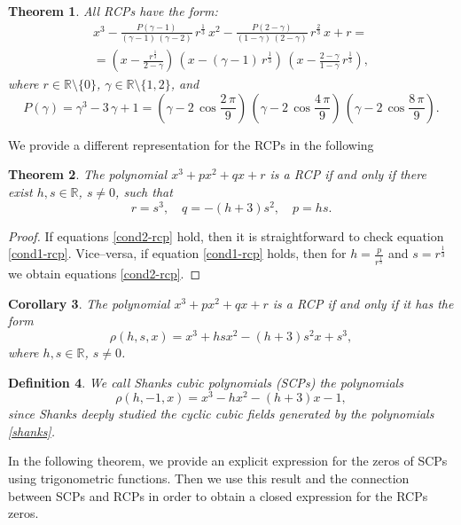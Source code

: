 \documentclass[12pt,reqno]{article}
\newtheorem{theorem}{Theorem}
\newtheorem{corollary}[theorem]{Corollary}
\newtheorem{defin}[theorem]{Definition}
\newenvironment{definition}{\begin{defin}\normalfont\quad}{\end{defin}}
\begin{document}
\begin{theorem}All RCPs have the form: 
\begin{multline*}
x^3 - \frac{P(\gamma-1)}{(\gamma-1)\, (\gamma-2)}\, r^{\frac{1}{3}}\, x^2 -
\frac{P(2-\gamma)}{(1-\gamma)\, (2-\gamma)}\, r^{\frac{2}{3}}\, x  + r = {}\\
{}=
\left( x - \frac{r^{\frac{1}{3}}}{2-\gamma} \right)\,
\left( x - (\gamma -1)\, r^{\frac{1}{3}}  \right)\,
\left( x - \frac{2-\gamma}{1-\gamma}\,r^{\frac{1}{3}} \right),
\end{multline*}
where $r\in \mathbb{R}\setminus \{0\}$,
$\gamma\in \mathbb{R}\setminus \{1,2\}$, and
$$
P(\gamma)=
\gamma^3 - 3\, \gamma + 1 =
\left( \gamma - 2\, \cos \frac{2\, \pi}{9} \right)\,
\left( \gamma - 2\, \cos \frac{4\, \pi}{9} \right)\,
\left( \gamma - 2\, \cos \frac{8\, \pi}{9} \right).
$$
\end{theorem}
 We provide a different representation for the RCPs in the following
\begin{theorem}
The polynomial $x^3+px^2+qx+r$ is a RCP if and only if there exist $h,s \in \mathbb R$, $s\not=0$, such that
\begin{equation} \label{cond2-rcp} r=s^3,\quad q=-(h+3)s^2,\quad p=hs.  \end{equation}
\end{theorem}
\begin{proof}
If equations \eqref{cond2-rcp} hold, then it is straightforward to check equation \eqref{cond1-rcp}. Vice--versa, if equation \eqref{cond1-rcp} holds, then for $h=\frac{p}{r^{\frac{1}{3}}}$ and $s=r^{\frac{1}{3}}$ we obtain equations \eqref{cond2-rcp}.
\end{proof}
\begin{corollary}
The polynomial $x^3+px^2+qx+r$ is a RCP if and only if it has the form
$$\rho(h,s,x)=x^3+hsx^2-(h+3)s^2x+s^3,$$
where $h,s\in\mathbb R$, $s\not=0$.
\end{corollary}
\begin{definition}
We call \emph{Shanks cubic polynomials} (SCPs) the polynomials
\begin{equation} \label{shanks} \rho(h,-1,x)=x^3-hx^2-(h+3)x-1,  \end{equation}
since Shanks \cite{Sha} deeply studied the cyclic cubic fields generated by the polynomials \eqref{shanks}.
\end{definition}
 In the following theorem, we provide an explicit expression for the zeros of SCPs using trigonometric functions. Then we use this result and the connection between SCPs and RCPs in order to obtain a closed expression for the RCPs zeros.
\end{document}

